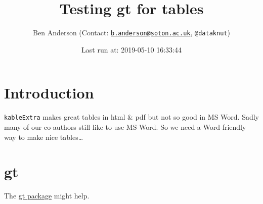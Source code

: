 \documentclass[]{article}
\title{Testing gt for tables}
\author{Ben Anderson (Contact:
\href{mailto:b.anderson@soton.ac.uk}{\nolinkurl{b.anderson@soton.ac.uk}},
\texttt{@dataknut})}
\date{Last run at: 2019-05-10 16:33:44}
\newenvironment{Shaded}{\begin{snugshade}}{\end{snugshade}}
\newcommand{\KeywordTok}[1]{\textcolor[rgb]{0.13,0.29,0.53}{\textbf{#1}}}
\newcommand{\StringTok}[1]{\textcolor[rgb]{0.31,0.60,0.02}{#1}}
\newcommand{\CommentTok}[1]{\textcolor[rgb]{0.56,0.35,0.01}{\textit{#1}}}
\newcommand{\OperatorTok}[1]{\textcolor[rgb]{0.81,0.36,0.00}{\textbf{#1}}}
\newcommand{\NormalTok}[1]{#1}
\begin{document}
\maketitle

{
\setcounter{tocdepth}{2}
\tableofcontents
}
\section{Introduction}\label{introduction}

\texttt{kableExtra} makes great tables in html \& pdf but not so good in
MS Word. Sadly many of our co-authors still like to use MS Word. So we
need a Word-friendly way to make nice tables\ldots{}

\section{gt}\label{gt}

The \href{https://github.com/rstudio/gt}{gt package} might help.

\begin{Shaded}
\end{Shaded}

\captionsetup[table]{labelformat=empty,skip=1pt}
\end{document}
